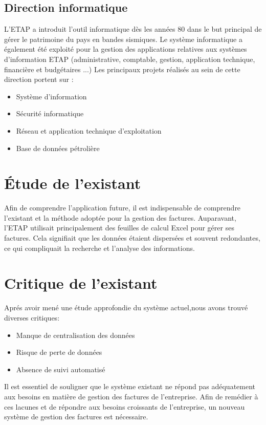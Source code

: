 \documentclass[12pt]{report}
\begin{document}
\subsection{Direction informatique}
L'ETAP a introduit l'outil informatique dès les années 80 dans le but \mbox{principal} de gérer le patrimoine du pays en bandes sismiques.
Le système informatique a également été exploité pour la gestion des applications
relatives aux systèmes d'information ETAP (administrative, comptable, gestion,
application technique, \mbox{financière} et budgétaires ...)
Les principaux projets réalisés au sein de cette \mbox{direction} portent sur :
\begin{itemize}[label={$\bullet$}]
	\item Système d'information
	\item Sécurité informatique
	\item Réseau et application technique d'exploitation
	\item Base de données pétrolière
\end{itemize}



\section{Étude de l'existant}
Afin de comprendre l'application future, il est indispensable de comprendre l'existant et la méthode adoptée pour la gestion des factures.
Auparavant, l'ETAP utilisait principalement des feuilles de calcul Excel pour gérer ses factures. Cela \mbox{signifiait} que les données étaient dispersées et souvent redondantes, ce qui \mbox{compliquait} la recherche et l'analyse des informations.
\section{Critique de l'existant}
Aprés avoir mené une étude approfondie du système actuel,nous avons trouvé diverses critiques:

\begin{itemize}[label={$\bullet$}]
	\item Manque de centralisation des données
	\item Risque de perte de données 
	\item Absence de suivi automatisé 
\end{itemize}

Il est essentiel de souligner que le système existant ne répond pas adéquatement aux besoins en matière de gestion des factures de l'entreprise. Afin de remédier à ces lacunes et de répondre aux besoins croissants de l'entreprise, un nouveau système de gestion des factures est nécessaire.
\end{document}
